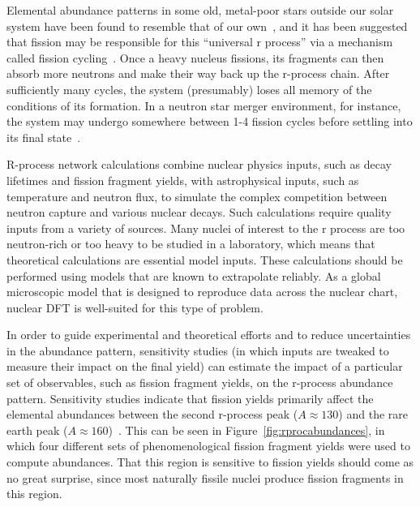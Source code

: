 Elemental abundance patterns in some old, metal-poor stars outside our solar system have been found to resemble that of our own~\cite{Arnould2007}, and it has been suggested that fission may be responsible for this ``universal r process'' via a mechanism called fission cycling~\cite{Beun2008}. Once a heavy nucleus fissions, its fragments can then absorb more neutrons and make their way back up the r-process chain. After sufficiently many cycles, the system (presumably) loses all memory of the conditions of its formation. In a neutron star merger environment, for instance, the system may undergo somewhere between 1-4 fission cycles before settling into its final state~\cite{Mendoza2015}.

R-process network calculations combine nuclear physics inputs, such as decay lifetimes and fission fragment yields, with astrophysical inputs, such as temperature and neutron flux, to simulate the complex competition between neutron capture and various nuclear decays. Such calculations require quality inputs from a variety of sources. Many nuclei of interest to the r process are too neutron-rich or too heavy to be studied in a laboratory, which means that theoretical calculations are essential model inputs. These calculations should be performed using models that are known to extrapolate reliably. As a global microscopic model that is designed to reproduce data across the nuclear chart, nuclear DFT is well-suited for this type of problem.

In order to guide experimental and theoretical efforts and to reduce uncertainties in the abundance pattern, sensitivity studies (in which inputs are tweaked to measure their impact on the final yield) can estimate the impact of a particular set of observables, such as fission fragment yields, on the r-process abundance pattern. Sensitivity studies indicate that fission yields primarily affect the elemental abundances between the second r-process peak ($A\approx130$) and the rare earth peak ($A\approx160$)~\cite{Goriely2015a, Eichler2015}. This can be seen in Figure~\ref{fig:rprocabundances}, in which four different sets of phenomenological fission fragment yields were used to compute abundances. That this region is sensitive to fission yields should come as no great surprise, since most naturally fissile nuclei produce fission fragments in this region.

